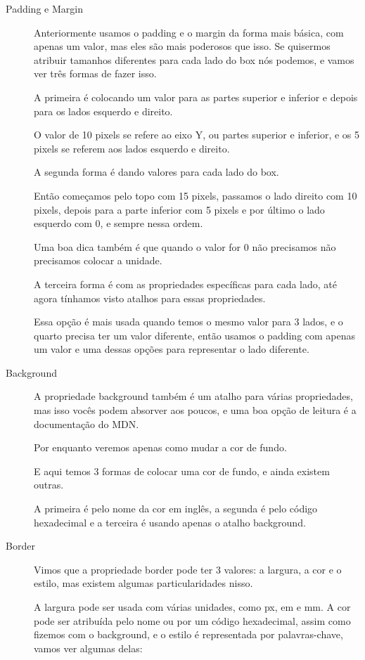 \documentclass[12pt,a4paper]{article}
\begin{document}
	\begin{description}
		\item[Padding e Margin] Anteriormente usamos o padding e o margin da forma mais básica, com apenas um valor, mas eles são mais poderosos que isso. Se quisermos atribuir tamanhos diferentes para cada lado do box nós podemos, e vamos ver três formas de fazer isso.
		
		A primeira é colocando um valor para as partes superior e inferior e depois para os lados esquerdo e direito.
		
		O valor de 10 pixels se refere ao eixo Y, ou partes superior e inferior, e os 5 pixels se referem aos lados esquerdo e direito.
		
		A segunda forma é dando valores para cada lado do box.
		
		Então começamos pelo topo com 15 pixels, passamos o lado direito com 10 pixels, depois para a parte inferior com 5 pixels e por último o lado esquerdo com 0, e sempre nessa ordem.
		
		Uma boa dica também é que quando o valor for 0 não precisamos não precisamos colocar a unidade.
		
		A terceira forma é com as propriedades específicas para cada lado, até agora tínhamos visto atalhos para essas propriedades.
		
		Essa opção é mais usada quando temos o mesmo valor para 3 lados, e o quarto precisa ter um valor diferente, então usamos o padding com apenas um valor e uma dessas opções para representar o lado diferente.
		
		\item[Background] A propriedade background também é um atalho para várias propriedades, mas isso vocês podem absorver aos poucos, e uma boa opção de leitura é a documentação do MDN.
		
		Por enquanto veremos apenas como mudar a cor de fundo.
		
		E aqui temos 3 formas de colocar uma cor de fundo, e ainda existem outras.
		
		A primeira é pelo nome da cor em inglês, a segunda é pelo código hexadecimal e a terceira é usando apenas o atalho background.
		
		\item[Border] Vimos que a propriedade border pode ter 3 valores: a largura, a cor e o estilo, mas existem algumas particularidades nisso.
		
		A largura pode ser usada com várias unidades, como px, em e mm. A cor pode ser atribuída pelo nome ou por um código hexadecimal, assim como fizemos com o background, e o estilo é representada por palavras-chave, vamos ver algumas delas:
		

\end{description}
\end{document}
